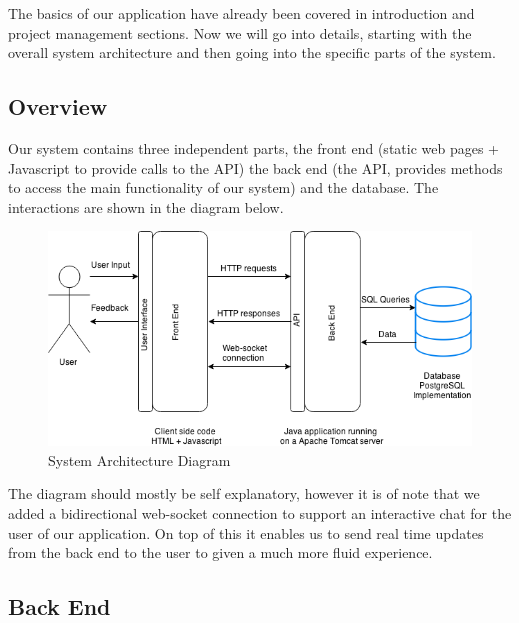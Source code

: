 \documentclass[10pt,a4paper]{article}
\begin{document}
The basics of our application have already been covered in introduction and project management sections. Now we will go into details, starting with the overall system architecture and then going into the specific parts of the system.

\subsection{Overview}

\noindent Our system contains three independent parts, the front end (static web pages + Javascript to provide calls to the API) the back end (the API, provides methods to access the main functionality of our system) and the database. The interactions are shown in the diagram below.

\begin{figure}[H]
\centerline{\includegraphics[scale=0.58,trim=0 0 100 0]{sysarch}}
\caption{System Architecture Diagram}
\end{figure}    

\noindent The diagram should mostly be self explanatory, however it is of note that we added a bidirectional web-socket connection to support an interactive chat for the user of our application. On top of this it enables us to send real time updates from the back end to the user to given a much more fluid experience.

\subsection{Back End}
\end{document}
